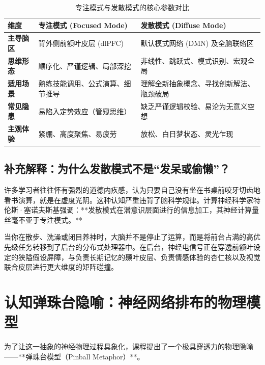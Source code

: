 \documentclass[12pt,a4paper,openany]{ctexbook}
\begin{document}
\begin{table}[H]
\centering
\small
\begin{tabular}{@{}lll@{}}
\toprule
\textbf{维度} & \textbf{专注模式 (Focused Mode)} & \textbf{发散模式 (Diffuse Mode)} \\ \midrule
\textbf{主导脑区} & 背外侧前额叶皮层 (dlPFC) & 默认模式网络 (DMN) 及全脑联络区 \\
\textbf{思维形态} & 顺序化、严谨逻辑、局部深挖 & 非线性、跳跃式、模式识别、宏观全局 \\
\textbf{适用场景} & 熟练技能调用、公式演算、细节推导 & 理解全新抽象概念、寻找创新解法、瓶颈破局 \\
\textbf{常见隐患} & 易陷入定势效应（管窥思维） & 缺乏严谨逻辑校验、易沦为无意义空想 \\
\textbf{主观体验} & 紧绷、高度聚焦、易疲劳 & 放松、白日梦状态、灵光乍现 \\ \bottomrule
\end{tabular}
\caption{专注模式与发散模式的核心参数对比}
\end{table}

\subsection*{补充解释：为什么发散模式不是“发呆或偷懒”？}

许多学习者往往怀有强烈的道德内疚感，认为只要自己没有坐在书桌前咬牙切齿地看书演算，就是在虚度光阴。这种认知严重违背了脑科学规律。计算神经科学家特伦斯·塞诺夫斯基强调：**发散模式在潜意识层面进行的信息加工，其神经计算量丝毫不亚于专注模式。** 

当你在散步、洗澡或闭目养神时，大脑并不是停止了运算，而是将前台占满的高优先级任务转移到了后台的分布式处理器中。在后台，神经电信号正在穿透前额叶设定的狭隘假设屏障，与负责长期记忆的颞叶皮层、负责情感体验的杏仁核以及视觉联合皮层进行更大维度的矩阵碰撞。

\section{认知弹珠台隐喻：神经网络排布的物理模型}

为了让这一抽象的神经物理过程具象化，课程提出了一个极具穿透力的物理隐喻——**弹珠台模型（Pinball Metaphor）**。
\end{document}
